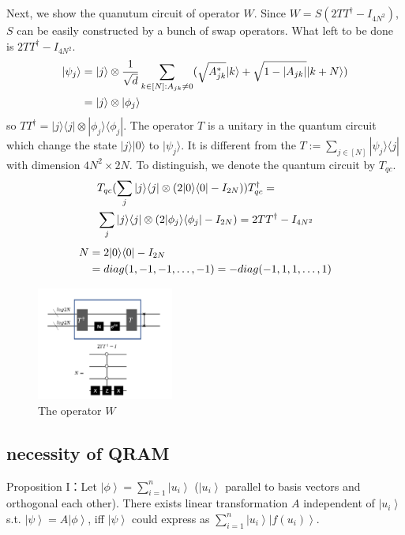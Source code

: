 \documentclass[%
 reprint,
 amsmath,amssymb,
pra,
]{revtex4-1}
\begin{document}
Next, we show the quanutum circuit of operator $W$. Since $W=S(2TT^\dagger-I_{4N^2})$, $S$ can be easily constructed by a bunch of swap operators.
What left to be done is $2TT^\dagger-I_{4N^2}$. 
\begin{align}
|\psi_j\rangle&=|j\rangle\otimes\frac{1}{\sqrt{d}} 
\sum_{k\in [N]:A_{jk}\neq 0}(\sqrt{A^*_{jk}}|k\rangle+\sqrt{1-|A_{jk}|}|k+N
\rangle)\notag\\
&=|j\rangle\otimes|\phi_j\rangle\notag
\end{align}
so $TT^\dagger=|j\rangle\langle j|\otimes|\phi_j\rangle\langle\phi_j|$.
The operator $T$ is a unitary in the quantum circuit which change
the state $|j\rangle|0\rangle$ to $|\psi_j\rangle$. It is different from the
$T:=\sum_{j\in[N]}|\psi_j\rangle\langle j|$ with dimension $4N^2\times2N$.
To distinguish, we denote the quantum circuit by $T_{qc}$.
\begin{align}
&T_{qc}(\sum_j|j\rangle\langle j|\otimes(2|0\rangle\langle0|-I_{2N}))
T_{qc}^\dagger=\notag\\
&\sum_j|j\rangle\langle j|\otimes
(2|\phi_j\rangle\langle \phi_j|-I_{2N})=2TT^\dagger-I_{4N^2}\notag
\end{align}
\begin{align}
N&=2|0\rangle\langle0|-I_{2N}\notag \\
&=diag(1,-1,-1,\dots,-1)=-diag(-1,1,1,\dots,1)\notag
\end{align}
\begin{figure}[htbp]
\centering
\includegraphics[width=0.4\textwidth]{Fig/WW}
\caption{The operator $W$}
\label{W}
\end{figure}



\subsection{necessity of QRAM}
\noindent Proposition I：Let $\left|\phi\right\rangle = \sum_{i=1}^n \left|u_i\right\rangle$ ($\left|u_i\right\rangle$ parallel to basis vectors and orthogonal each other). There exists 
linear transformation $A$ independent of $\left|u_{i}\right\rangle$ s.t. $\left|\psi\right\rangle = A\left|\phi\right\rangle$, iff $\left|\psi\right\rangle$ could express as $\sum_{i=1}^{n}\left|u_i\right\rangle\left|f\left(u_i\right)\right\rangle$.
\end{document}
